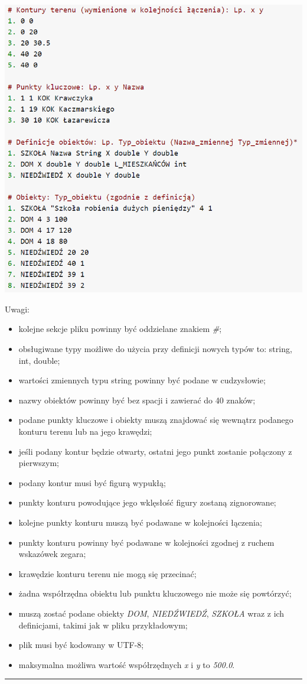 \documentclass[a4paper,11pt]{article}
\newcommand{\linia}{\rule{\linewidth}{0.4mm}}
\begin{document}
\includegraphics[scale=0.70]{ExampleInputFile}

\noindent
Uwagi:
\begin{itemize}
\item kolejne sekcje pliku powinny być oddzielane znakiem \textit{\#};
\item obsługiwane typy możliwe do użycia przy definicji nowych typów to: string, int, double;
\item wartości zmiennych typu string powinny być podane w cudzysłowie;
\item nazwy obiektów powinny być bez spacji i zawierać do 40 znaków;
\item podane punkty kluczowe i obiekty muszą znajdować się wewnątrz podanego konturu terenu lub na jego krawędzi;
\item jeśli podany kontur będzie otwarty, ostatni jego punkt zostanie połączony z pierwszym;
\item podany kontur musi być figurą wypukłą;
\item punkty konturu powodujące jego wklęsłość figury zostaną zignorowane;
\item kolejne punkty konturu muszą być podawane w kolejności łączenia;
\item punkty konturu powinny być podawane w kolejności zgodnej z ruchem wskazówek zegara;
\item krawędzie konturu terenu nie mogą się przecinać;
\item żadna współrzędna obiektu lub punktu kluczowego nie może się powtórzyć;
\item muszą zostać podane obiekty \textit{DOM}, \textit{NIEDŹWIEDŹ}, \textit{SZKOŁA} wraz z ich definicjami, takimi jak w pliku przykładowym;
\item plik musi być kodowany w UTF-8;
\item maksymalna możliwa wartość współrzędnych \textit{x} i \textit{y} to \textit{500.0}.
\end{itemize}
\noindent\linia
\end{document}
